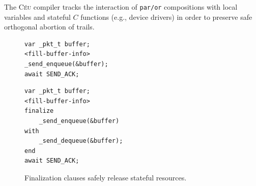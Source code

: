 \documentclass{sigplanconf}
\newcommand{\CEU}{\textsc{C\'{e}u}\xspace}
\newcommand{\code}[1] {{\small{\texttt{#1}}}}
\newcommand{\1}{\;}
\newcommand{\2}{\;\;}
\newcommand{\3}{\;\;\;}
\newcommand{\5}{\;\;\;\;\;}
\begin{document}
%
The \CEU compiler tracks the interaction of \code{par/or} compositions with 
local variables and stateful $C$ functions (e.g., device drivers) in order to 
preserve safe orthogonal abortion of trails.
%

\begin{figure}[t]
\begin{minipage}[t]{0.45\linewidth}
\begin{lstlisting}
var _pkt_t buffer;
<fill-buffer-info>
_send_enqueue(&buffer);
await SEND_ACK;
\end{lstlisting}
\end{minipage}
%
\begin{minipage}[t]{0.50\linewidth}
\begin{lstlisting}
var _pkt_t buffer;
<fill-buffer-info>
finalize
    _send_enqueue(&buffer)
with
    _send_dequeue(&buffer);
end
await SEND_ACK;
\end{lstlisting}
\end{minipage}
\caption{ Finalization clauses safely release stateful resources.
\label{lst.fin}
}
\end{figure}
\end{document}
